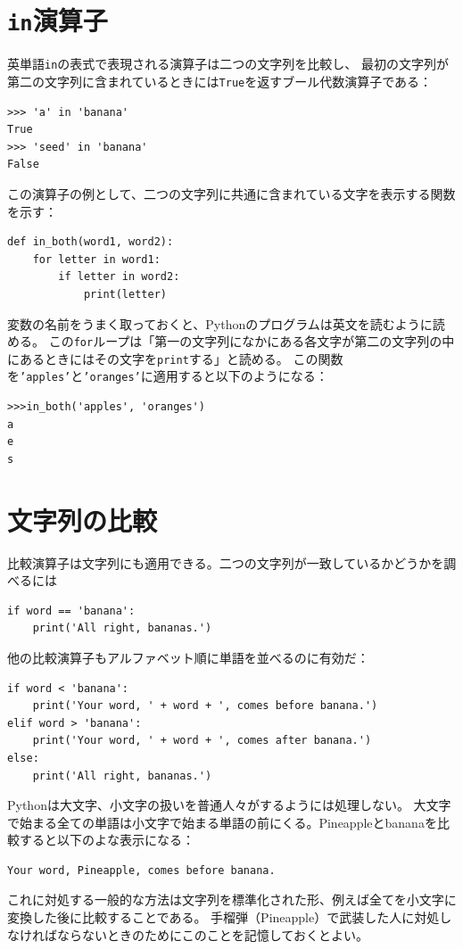 \documentclass[a4j,12pt,makeidx]{jbook}
\begin{document}
\section{{\tt in}演算子}
英単語{\tt in}の表式で表現される演算子は二つの文字列を比較し、
最初の文字列が第二の文字列に含まれているときには{\tt True}を返すブール代数演算子である：
\begin{verbatim}
>>> 'a' in 'banana'
True
>>> 'seed' in 'banana'
False
\end{verbatim} \par
この演算子の例として、二つの文字列に共通に含まれている文字を表示する関数を示す：
\begin{verbatim}
def in_both(word1, word2):
    for letter in word1:
        if letter in word2:
            print(letter)
\end{verbatim}
変数の名前をうまく取っておくと、Pythonのプログラムは英文を読むように読める。
この{\tt for}ループは「第一の文字列になかにある各文字が第二の文字列の中にあるときにはその文字を{\tt print}する」と読める。
この関数を{\tt 'apples'}と{\tt 'oranges'}に適用すると以下のようになる：
\begin{verbatim}
>>>in_both('apples', 'oranges')
a
e
s
\end{verbatim}
%
\section{文字列の比較}
比較演算子は文字列にも適用できる。二つの文字列が一致しているかどうかを調べるには
\begin{verbatim}
if word == 'banana':
    print('All right, bananas.')
\end{verbatim} \par
他の比較演算子もアルファベット順に単語を並べるのに有効だ：
\begin{verbatim}
if word < 'banana':
    print('Your word, ' + word + ', comes before banana.')
elif word > 'banana':
    print('Your word, ' + word + ', comes after banana.')
else:
    print('All right, bananas.')
\end{verbatim}
Pythonは大文字、小文字の扱いを普通人々がするようには処理しない。
大文字で始まる全ての単語は小文字で始まる単語の前にくる。Pineappleとbananaを比較すると以下のよな表示になる：
\begin{verbatim}
Your word, Pineapple, comes before banana.
\end{verbatim} \par
これに対処する一般的な方法は文字列を標準化された形、例えば全てを小文字に変換した後に比較することである。
手榴弾（Pineapple）で武装した人に対処しなければならないときのためにこのことを記憶しておくとよい。
%
\end{document}
